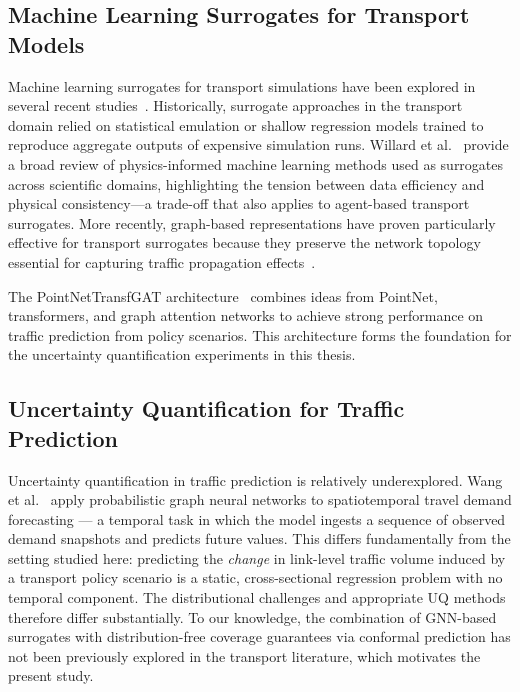 \subsection{Machine Learning Surrogates for Transport Models}

Machine learning surrogates for transport simulations have been explored in several recent studies~\cite{natterer2025ml}. Historically, surrogate approaches in the transport domain relied on statistical emulation or shallow regression models trained to reproduce aggregate outputs of expensive simulation runs. Willard et al.~\cite{willard2022integrating} provide a broad review of physics-informed machine learning methods used as surrogates across scientific domains, highlighting the tension between data efficiency and physical consistency---a trade-off that also applies to agent-based transport surrogates. More recently, graph-based representations have proven particularly effective for transport surrogates because they preserve the network topology essential for capturing traffic propagation effects~\cite{natterer2025ml}.

The PointNetTransfGAT architecture~\cite{natterer2025ml} combines ideas from PointNet, transformers, and graph attention networks to achieve strong performance on traffic prediction from policy scenarios. This architecture forms the foundation for the uncertainty quantification experiments in this thesis.

\subsection{Uncertainty Quantification for Traffic Prediction}

Uncertainty quantification in traffic prediction is relatively underexplored. Wang et al.~\cite{wang2024uncertainty} apply probabilistic graph neural networks to spatiotemporal travel demand forecasting --- a temporal task in which the model ingests a sequence of observed demand snapshots and predicts future values. This differs fundamentally from the setting studied here: predicting the \emph{change} in link-level traffic volume induced by a transport policy scenario is a static, cross-sectional regression problem with no temporal component. The distributional challenges and appropriate UQ methods therefore differ substantially. To our knowledge, the combination of GNN-based surrogates with distribution-free coverage guarantees via conformal prediction has not been previously explored in the transport literature, which motivates the present study.

